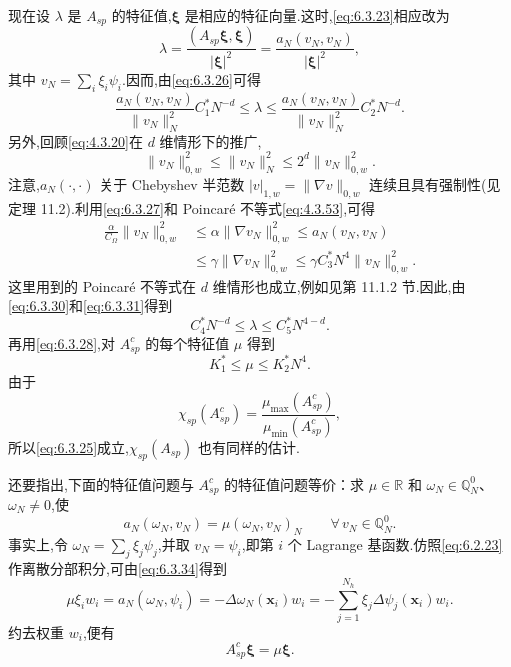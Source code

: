 现在设 \(\lambda\) 是 \(A_{sp}\) 的特征值,\(\boldsymbol{\xi}\) 是相应的特征向量.这时,\eqref{eq:6.3.23}相应改为
\begin{equation}\label{eq:6.3.29}
  \lambda=\frac{(A_{sp}\boldsymbol{\xi},\boldsymbol{\xi})}{|\boldsymbol{\xi}|^2}
     =\frac{a_N(v_N,v_N)}{|\boldsymbol{\xi}|^2},
\end{equation}
其中 \(v_N=\sum_i\xi_i\psi_i\).因而,由\eqref{eq:6.3.26}可得
\begin{equation}\label{eq:6.3.30}
  \frac{a_N(v_N,v_N)}{\|v_N\|_N^2}C_1^*N^{-d}
    \le\lambda\le\frac{a_N(v_N,v_N)}{\|v_N\|_N^2}C_2^*N^{-d}.
\end{equation}
另外,回顾\eqref{eq:4.3.20}在 \(d\) 维情形下的推广,
\begin{equation}\label{eq:6.3.31}
  \|v_N\|_{0,w}^2\le\|v_N\|_N^2\le2^d\|v_N\|_{0,w}^2.
\end{equation}
注意,\(a_N(\cdot,\cdot)\) 关于 Chebyshev 半范数 \(|v|_{1,w}=\|\nabla v\|_{0,w}\) 连续且具有强制性(见定理 11.2).利用\eqref{eq:6.3.27}和 Poincaré 不等式\eqref{eq:4.3.53},可得
\[
  \begin{aligned}
    \frac{\alpha}{C_\Omega}\|v_N\|_{0,w}^2&\le\alpha\|\nabla v_N\|_{0,w}^2
       \le a_N(v_N,v_N)\\
       &\le\gamma\|\nabla v_N\|_{0,w}^2\le\gamma C_3^*N^4\|v_N\|_{0,w}^2.
  \end{aligned}
\]
这里用到的 Poincaré 不等式在 \(d\) 维情形也成立,例如见第 11.1.2 节.因此,由\eqref{eq:6.3.30}和\eqref{eq:6.3.31}得到
\begin{equation}\label{eq:6.3.32}
  C_4^*N^{-d}\le\lambda\le C_5^*N^{4-d}.
\end{equation}
再用\eqref{eq:6.3.28},对 \(A_{sp}^c\) 的每个特征值 \(\mu\) 得到
\begin{equation}\label{eq:6.3.33}
  K_1^*\le\mu\le K_2^*N^4.
\end{equation}
由于
\[
  \chi_{sp}(A_{sp}^c)=\frac{\mu_{\max}(A_{sp}^c)}{\mu_{\min}(A_{sp}^c)},
\]
所以\eqref{eq:6.3.25}成立,\(\chi_{sp}(A_{sp})\) 也有同样的估计.

还要指出,下面的特征值问题与 \(A_{sp}^c\) 的特征值问题等价：求 \(\mu\in\mathbb R\) 和 \(\omega_N\in\mathbb Q_N^0\)、\(\omega_N\ne0\),使
\begin{equation}\label{eq:6.3.34}
  a_N(\omega_N,v_N)=\mu(\omega_N,v_N)_N\qquad\forall\,v_N\in\mathbb Q_N^0.
\end{equation}
事实上,令 \(\omega_N=\sum_j\xi_j\psi_j\),并取 \(v_N=\psi_i\),即第 \(i\) 个 Lagrange 基函数.仿照\eqref{eq:6.2.23}作离散分部积分,可由\eqref{eq:6.3.34}得到
\[
  \mu\xi_iw_i=a_N(\omega_N,\psi_i)=-\Delta\omega_N(\boldsymbol{x}_i)w_i
    =-\sum_{j=1}^{N_h}\xi_j\Delta\psi_j(\boldsymbol{x}_i)w_i.
\]
约去权重 \(w_i\),便有
\[
  A_{sp}^c\boldsymbol{\xi}=\mu\boldsymbol{\xi}.
\]

